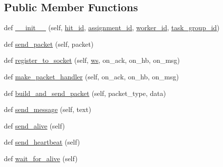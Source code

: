 \subsection*{Public Member Functions}
\begin{DoxyCompactItemize}
\item 
def \hyperlink{classparlai_1_1mturk_1_1core_1_1legacy__2018_1_1test_1_1test__socket__manager_1_1MockAgent_a746f067b826dce10f774460bc1743cef}{\+\_\+\+\_\+init\+\_\+\+\_\+} (self, \hyperlink{classparlai_1_1mturk_1_1core_1_1legacy__2018_1_1test_1_1test__socket__manager_1_1MockAgent_a1c5fee1dd1e0b00d748f2cfcc0770d82}{hit\+\_\+id}, \hyperlink{classparlai_1_1mturk_1_1core_1_1legacy__2018_1_1test_1_1test__socket__manager_1_1MockAgent_a03ef31a1406bda9f0abb0873db10d340}{assignment\+\_\+id}, \hyperlink{classparlai_1_1mturk_1_1core_1_1legacy__2018_1_1test_1_1test__socket__manager_1_1MockAgent_a57ecf3365ca0671abce95b9f36478336}{worker\+\_\+id}, \hyperlink{classparlai_1_1mturk_1_1core_1_1legacy__2018_1_1test_1_1test__socket__manager_1_1MockAgent_a879a8e8d5fc5d0422d043bb35974cc4f}{task\+\_\+group\+\_\+id})
\item 
def \hyperlink{classparlai_1_1mturk_1_1core_1_1legacy__2018_1_1test_1_1test__socket__manager_1_1MockAgent_a84f2bd95d9fbef45b8618ce49c4de9be}{send\+\_\+packet} (self, packet)
\item 
def \hyperlink{classparlai_1_1mturk_1_1core_1_1legacy__2018_1_1test_1_1test__socket__manager_1_1MockAgent_aa02e8404e36bc2afa425163c297f7951}{register\+\_\+to\+\_\+socket} (self, \hyperlink{classparlai_1_1mturk_1_1core_1_1legacy__2018_1_1test_1_1test__socket__manager_1_1MockAgent_a1a63165252006ad3c2b758c840f57c0d}{ws}, on\+\_\+ack, on\+\_\+hb, on\+\_\+msg)
\item 
def \hyperlink{classparlai_1_1mturk_1_1core_1_1legacy__2018_1_1test_1_1test__socket__manager_1_1MockAgent_af0f9ec941e61587e1f4145c354031d7a}{make\+\_\+packet\+\_\+handler} (self, on\+\_\+ack, on\+\_\+hb, on\+\_\+msg)
\item 
def \hyperlink{classparlai_1_1mturk_1_1core_1_1legacy__2018_1_1test_1_1test__socket__manager_1_1MockAgent_a92049431d43dcfefe8bea697f7c81aa4}{build\+\_\+and\+\_\+send\+\_\+packet} (self, packet\+\_\+type, data)
\item 
def \hyperlink{classparlai_1_1mturk_1_1core_1_1legacy__2018_1_1test_1_1test__socket__manager_1_1MockAgent_ac8b15287750a3cfc08b06d3ea46bbe0e}{send\+\_\+message} (self, text)
\item 
def \hyperlink{classparlai_1_1mturk_1_1core_1_1legacy__2018_1_1test_1_1test__socket__manager_1_1MockAgent_af4be545b2b35cd69f008d19e6c1b0f83}{send\+\_\+alive} (self)
\item 
def \hyperlink{classparlai_1_1mturk_1_1core_1_1legacy__2018_1_1test_1_1test__socket__manager_1_1MockAgent_a554bb34a534623af988f14f63a9e6be4}{send\+\_\+heartbeat} (self)
\item 
def \hyperlink{classparlai_1_1mturk_1_1core_1_1legacy__2018_1_1test_1_1test__socket__manager_1_1MockAgent_a4ea4840e84079c5503dab6cf1269c01b}{wait\+\_\+for\+\_\+alive} (self)
\end{DoxyCompactItemize}
